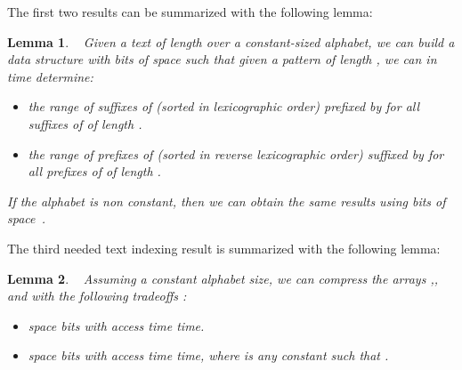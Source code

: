 \documentclass{article}
\newcommand{\?}{\mskip1.5mu}
\newtheorem{lemma}{Lemma}
\begin{document}
The first two results can be summarized with the following lemma:
\begin{lemma}~\cite{FM05}
Given a text  of length  over a constant-sized alphabet, we can build a data structure with  bits of space such that given a pattern  of length , we can in  time determine:
\begin{itemize}
\item the range of suffixes of  (sorted in lexicographic order) prefixed by  for all suffixes  of  of length .
\item the range of prefixes of  (sorted in reverse lexicographic order) suffixed by  for all prefixes  of  of length .
\end{itemize}
If the alphabet is non constant, then we can obtain the same results using  bits of space~\cite{BN11}. 
\end{lemma}
The third needed text indexing result is summarized with the following lemma:
\begin{lemma}~\cite{GV05,Rao02,LSW05}
\label{lemma:compr_suf_array}
Assuming a constant alphabet size, we can compress the arrays ,, and  with the following tradeoffs : 
\begin{itemize}
\item space  bits with access time  time. 
\item space  bits with access time  time, where  is any constant
such that . 
\end{itemize}
\end{lemma}
\end{document}
